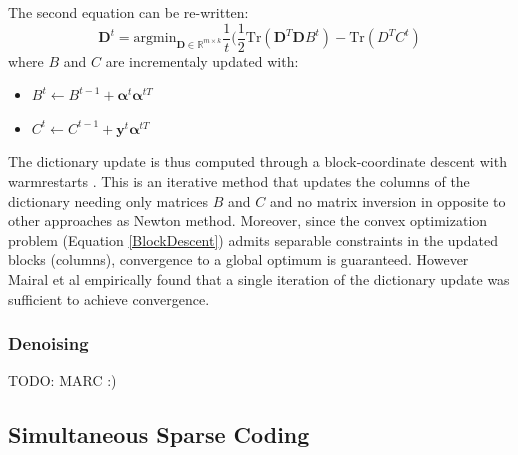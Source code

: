 \documentclass{ipol}
\newcommand{\psize}{m}
\newcommand{\dsize}{k}
\newcommand{\dict}{\textbf{D}}
\newcommand{\code}{\bm{\alpha}}
\newcommand{\noi}{\textbf{y}}
\newcommand{\RR}{\mathbb{R}}
\newcommand{\argmin}{\text{argmin}}
\begin{document}
The second equation can be re-written:
\begin{equation}
	\dict^{t}= \argmin_{\dict \in \RR^{\psize \times \dsize}} \frac{1}{t} (\frac{1}{2} \text{Tr}(\dict^T \dict B^t)- \text{Tr}(D^T C^t )
	\label{BlockDescent}
\end{equation}
where $B$ and $C$ are incrementaly updated with:
\begin{itemize}
	\item $B^t \leftarrow B^{t-1} + \code^t \code^{tT}$
	\item $C^t \leftarrow C^{t-1} + \noi^t \code^{tT}$
\end{itemize}
The dictionary update is thus computed through a block-coordinate descent with warmrestarts \cite{BlockDescent}. This is an iterative method that updates the columns of the dictionary needing only matrices $B$ and $C$ and no matrix inversion in opposite to other approaches as Newton method. Moreover, since the convex optimization problem (Equation \eqref{BlockDescent}) admits separable constraints in the updated blocks (columns), convergence to a global optimum is guaranteed. However Mairal et al empirically found that a single iteration of the dictionary update was sufficient to achieve convergence.

\subsubsection{Denoising}
TODO: MARC :)

\subsection{Simultaneous Sparse Coding}
\end{document}

